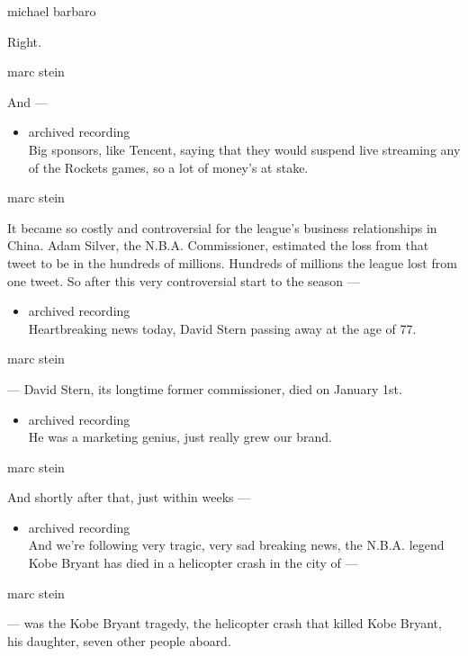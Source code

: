 michael barbaro

Right.

marc stein

And ---

\begin{itemize}
\tightlist
\item
  archived recording\\
  Big sponsors, like Tencent, saying that they would suspend live
  streaming any of the Rockets games, so a lot of money's at stake.
\end{itemize}

marc stein

It became so costly and controversial for the league's business
relationships in China. Adam Silver, the N.B.A. Commissioner, estimated
the loss from that tweet to be in the hundreds of millions. Hundreds of
millions the league lost from one tweet. So after this very
controversial start to the season ---

\begin{itemize}
\tightlist
\item
  archived recording\\
  Heartbreaking news today, David Stern passing away at the age of 77.
\end{itemize}

marc stein

--- David Stern, its longtime former commissioner, died on January 1st.

\begin{itemize}
\tightlist
\item
  archived recording\\
  He was a marketing genius, just really grew our brand.
\end{itemize}

marc stein

And shortly after that, just within weeks ---

\begin{itemize}
\tightlist
\item
  archived recording\\
  And we're following very tragic, very sad breaking news, the N.B.A.
  legend Kobe Bryant has died in a helicopter crash in the city of ---
\end{itemize}

marc stein

--- was the Kobe Bryant tragedy, the helicopter crash that killed Kobe
Bryant, his daughter, seven other people aboard.

